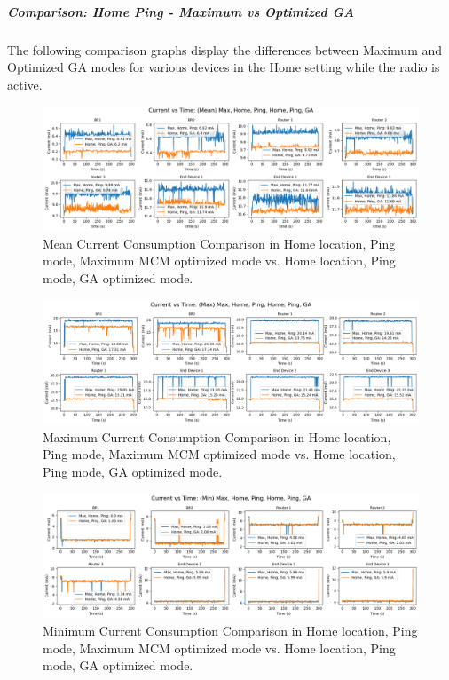 \subparagraph{Comparison: Home Ping - Maximum vs Optimized GA}
The following comparison graphs display the differences between Maximum and Optimized GA modes for various devices in the Home setting while the radio is active.

\begin{figure}[H]
  \centering
  \includegraphics[width=1\textwidth]{images/research_results/current_consumption_analysis/optimized/home/ping/ga/comparison/mean_comparison_home_ping_max_vs_home_ping_ga.png}
    \caption{Mean Current Consumption Comparison in Home location, Ping mode, Maximum MCM optimized mode vs. Home location, Ping mode, GA optimized mode.}
    \label{fig:mean_comparison_home_ping_max_vs_home_ping_ga}
\end{figure}

\begin{figure}[H]
  \centering
  \includegraphics[width=1\textwidth]{images/research_results/current_consumption_analysis/optimized/home/ping/ga/comparison/max_comparison_home_ping_max_vs_home_ping_ga.png}
    \caption{Maximum Current Consumption Comparison in Home location, Ping mode, Maximum MCM optimized mode vs. Home location, Ping mode, GA optimized mode.}
    \label{fig:max_comparison_home_ping_max_vs_home_ping_ga}
\end{figure}

\begin{figure}[H]
  \centering
  \includegraphics[width=1\textwidth]{images/research_results/current_consumption_analysis/optimized/home/ping/ga/comparison/min_comparison_home_ping_max_vs_home_ping_ga.png}
    \caption{Minimum Current Consumption Comparison in Home location, Ping mode, Maximum MCM optimized mode vs. Home location, Ping mode, GA optimized mode.}
    \label{fig:min_comparison_home_ping_max_vs_home_ping_ga}
\end{figure}

